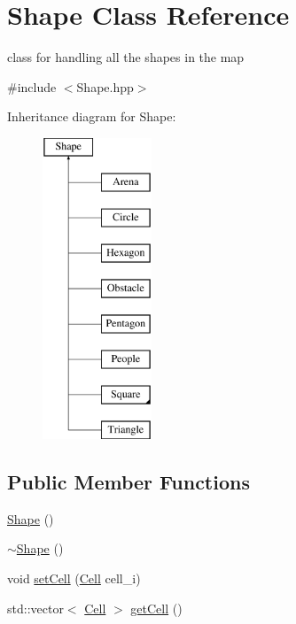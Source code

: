 \hypertarget{class_shape}{}\section{Shape Class Reference}
\label{class_shape}


class for handling all the shapes in the map  




{\ttfamily \#include $<$Shape.\+hpp$>$}

Inheritance diagram for Shape\+:\begin{figure}[H]
\begin{center}
\leavevmode
\includegraphics[height=9.000000cm]{class_shape}
\end{center}
\end{figure}
\subsection*{Public Member Functions}
\begin{DoxyCompactItemize}
\item 
\mbox{\hyperlink{class_shape_aaa8d87171e65e0d8ba3c5459978992a7}{Shape}} ()
\item 
\mbox{\hyperlink{class_shape_a935afc9e576015f967d90de56977167d}{$\sim$\+Shape}} ()
\item 
void \mbox{\hyperlink{class_shape_a9f07382e9173d32feaa737fe57560c9c}{set\+Cell}} (\mbox{\hyperlink{class_cell}{Cell}} cell\+\_\+i)
\item 
std\+::vector$<$ \mbox{\hyperlink{class_cell}{Cell}} $>$ \mbox{\hyperlink{class_shape_ad1951cad2df16392cab74b472020b851}{get\+Cell}} ()
\end{DoxyCompactItemize}



